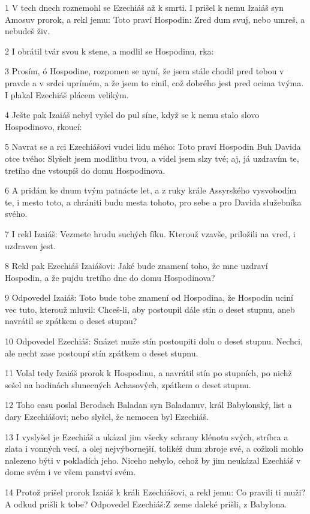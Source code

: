 \par 1 V tech dnech roznemohl se Ezechiáš až k smrti. I prišel k nemu Izaiáš syn Amosuv prorok, a rekl jemu: Toto praví Hospodin: Zred dum svuj, nebo umreš, a nebudeš živ.
\par 2 I obrátil tvár svou k stene, a modlil se Hospodinu, rka:
\par 3 Prosím, ó Hospodine, rozpomen se nyní, že jsem stále chodil pred tebou v pravde a v srdci uprímém, a že jsem to cinil, což dobrého jest pred ocima tvýma. I plakal Ezechiáš plácem velikým.
\par 4 Ješte pak Izaiáš nebyl vyšel do pul síne, když se k nemu stalo slovo Hospodinovo, rkoucí:
\par 5 Navrat se a rci Ezechiášovi vudci lidu mého: Toto praví Hospodin Buh Davida otce tvého: Slyšelt jsem modlitbu tvou, a videl jsem slzy tvé; aj, já uzdravím te, tretího dne vstoupíš do domu Hospodinova.
\par 6 A pridám ke dnum tvým patnácte let, a z ruky krále Assyrského vysvobodím te, i mesto toto, a chrániti budu mesta tohoto, pro sebe a pro Davida služebníka svého.
\par 7 I rekl Izaiáš: Vezmete hrudu suchých fíku. Kterouž vzavše, priložili na vred, i uzdraven jest.
\par 8 Rekl pak Ezechiáš Izaiášovi: Jaké bude znamení toho, že mne uzdraví Hospodin, a že pujdu tretího dne do domu Hospodinova?
\par 9 Odpovedel Izaiáš: Toto bude tobe znamení od Hospodina, že Hospodin uciní vec tuto, kterouž mluvil: Chceš-li, aby postoupil dále stín o deset stupnu, aneb navrátil se zpátkem o deset stupnu?
\par 10 Odpovedel Ezechiáš: Snázet muže stín postoupiti dolu o deset stupnu. Nechci, ale necht zase postoupí stín zpátkem o deset stupnu.
\par 11 Volal tedy Izaiáš prorok k Hospodinu, a navrátil stín po stupních, po nichž sešel na hodinách slunecných Achasových, zpátkem o deset stupnu.
\par 12 Toho casu poslal Berodach Baladan syn Baladanuv, král Babylonský, list a dary Ezechiášovi; nebo slyšel, že nemocen byl Ezechiáš.
\par 13 I vyslyšel je Ezechiáš a ukázal jim všecky schrany klénotu svých, stríbra a zlata i vonných vecí, a olej nejvýbornejší, tolikéž dum zbroje své, a cožkoli mohlo nalezeno býti v pokladích jeho. Niceho nebylo, cehož by jim neukázal Ezechiáš v dome svém i ve všem panství svém.
\par 14 Protož prišel prorok Izaiáš k králi Ezechiášovi, a rekl jemu: Co pravili ti muži? A odkud prišli k tobe? Odpovedel Ezechiáš:Z zeme daleké prišli, z Babylona.
